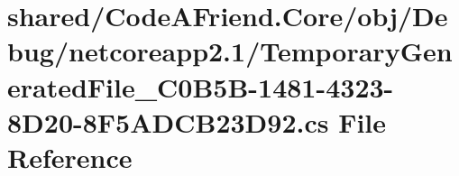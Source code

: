\hypertarget{shared_2_code_a_friend_8_core_2obj_2_debug_2netcoreapp2_81_2_temporary_generated_file__036_c0_b5711c80fb9d99c5f77c091f8b077de2db}{}\section{shared/\+Code\+A\+Friend.Core/obj/\+Debug/netcoreapp2.1/\+Temporary\+Generated\+File\+\_\+C0\+B5\+B-\/1481-\/4323-\/8\+D20-\/8\+F5\+A\+D\+C\+B23\+D92.cs File Reference}
\label{shared_2_code_a_friend_8_core_2obj_2_debug_2netcoreapp2_81_2_temporary_generated_file__036_c0_b5711c80fb9d99c5f77c091f8b077de2db}
